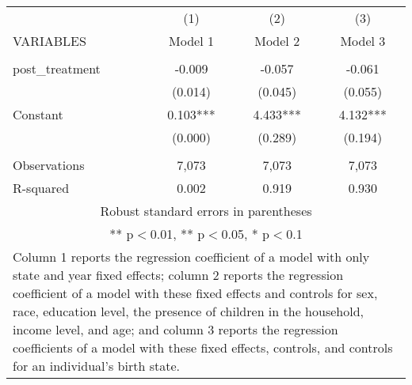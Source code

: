 \begin{tabular}{lccc}
\hline
 & (1) & (2) & (3) \\
VARIABLES & Model 1 & Model 2 & Model 3 \\ \hline
 &  &  &  \\
post\_treatment & -0.009 & -0.057 & -0.061 \\
 & (0.014) & (0.045) & (0.055) \\
Constant & 0.103*** & 4.433*** & 4.132*** \\
 & (0.000) & (0.289) & (0.194) \\
 &  &  &  \\
Observations & 7,073 & 7,073 & 7,073 \\
 R-squared & 0.002 & 0.919 & 0.930 \\ \hline
\multicolumn{4}{c}{\small Robust standard errors in parentheses} \\
\multicolumn{4}{c}{\small *** p$<$0.01, ** p$<$0.05, * p$<$0.1} \\
\multicolumn{4}{p{0.8\linewidth}}{\small Column 1 reports the
regression coefficient of a model with only state and year fixed effects; column 2 reports the
regression coefficient of a model with these fixed effects and controls for sex, race, education
level, the presence of children in the household, income level, and age; and column 3 reports
the regression coefficients of a model with these fixed effects, controls, and controls for an
individual’s birth state.} \\
\end{tabular}
